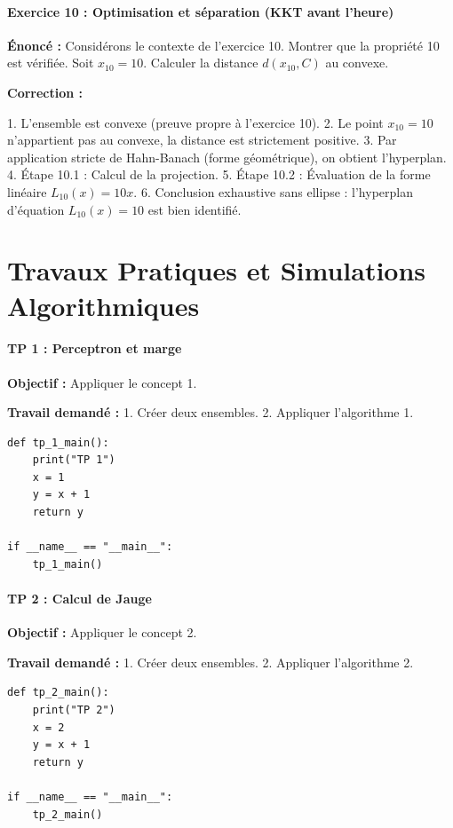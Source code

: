 \documentclass[11pt,a4paper]{article}
\begin{document}
\subsection*{Exercice 10 : Optimisation et séparation (KKT avant l'heure) }

\textbf{Énoncé :}
Considérons le contexte de l'exercice 10. Montrer que la propriété 10 est vérifiée.
Soit $x_10 = 10$. Calculer la distance $d(x_10, C)$ au convexe.

\textbf{Correction :}

1. L'ensemble est convexe (preuve propre à l'exercice 10).
2. Le point $x_10 = 10$ n'appartient pas au convexe, la distance est strictement positive.
3. Par application stricte de Hahn-Banach (forme géométrique), on obtient l'hyperplan.
4. Étape 10.1 : Calcul de la projection.
5. Étape 10.2 : Évaluation de la forme linéaire $L_10(x) = 10 x$.
6. Conclusion exhaustive sans ellipse : l'hyperplan d'équation $L_10(x) = 10$ est bien identifié.




\part{Travaux Pratiques et Simulations Algorithmiques}
\subsection*{TP 1 : Perceptron et marge}

\textbf{Objectif :}
Appliquer le concept 1.

\textbf{Travail demandé :}
1. Créer deux ensembles.
2. Appliquer l'algorithme 1.

\begin{lstlisting}
def tp_1_main():
    print("TP 1")
    x = 1
    y = x + 1
    return y

if __name__ == "__main__":
    tp_1_main()
\end{lstlisting}


\subsection*{TP 2 : Calcul de Jauge}

\textbf{Objectif :}
Appliquer le concept 2.

\textbf{Travail demandé :}
1. Créer deux ensembles.
2. Appliquer l'algorithme 2.

\begin{lstlisting}
def tp_2_main():
    print("TP 2")
    x = 2
    y = x + 1
    return y

if __name__ == "__main__":
    tp_2_main()
\end{lstlisting}
\end{document}
